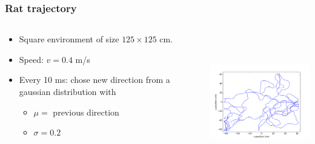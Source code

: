 \documentclass[mathserif]{beamer}
\begin{document}
%
\begin{frame}
\frametitle{Rat trajectory}
  \begin{columns}[T]
    \begin{column}{.5\textwidth}
			\begin{itemize}
		    \item Square environment of size $125 \times 125$ cm.
		    \item Speed: $v=0.4$ m/s
		    \item Every 10 ms: chose new direction from a gaussian distribution with 
		    	\begin{itemize}
		    	\item $\mu=$ previous direction
		    	\item $\sigma= 0.2$
		    	\end{itemize}
		    \end{itemize}
    \end{column}
    \begin{column}{.5\textwidth}
    \includegraphics[width=6cm, height=6cm]{pics/running_rat.png}
    \end{column}
  \end{columns}
\end{frame}



\end{document}

